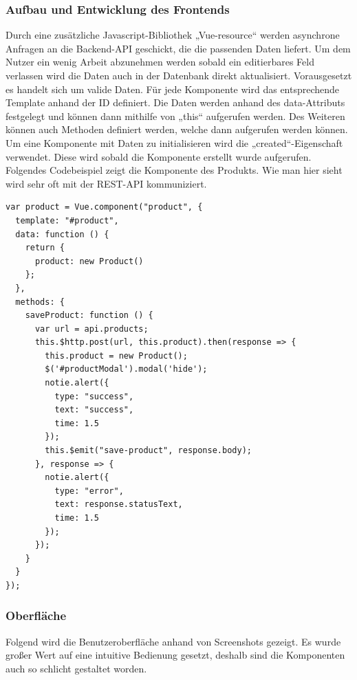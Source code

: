 \subsubsection{Aufbau und Entwicklung des Frontends}  
\label{sec:Aufbau und Entwicklung des Frontends-1}

Durch eine zusätzliche Javascript-Bibliothek „Vue-resource“ werden asynchrone Anfragen an die Backend-\ac{API} geschickt, die die passenden Daten liefert. Um dem Nutzer ein wenig Arbeit abzunehmen werden sobald ein editierbares Feld verlassen wird die Daten auch in der Datenbank direkt aktualisiert. Vorausgesetzt es handelt sich um valide Daten.
Für jede Komponente wird das entsprechende Template anhand der ID definiert.
Die Daten werden anhand des data-Attributs festgelegt und können dann mithilfe von „this“ aufgerufen werden. 
Des Weiteren können auch Methoden definiert werden, welche dann aufgerufen werden können. Um eine Komponente mit Daten zu initialisieren wird die „created“-Eigenschaft verwendet. Diese wird sobald die Komponente erstellt wurde aufgerufen. Folgendes Codebeispiel zeigt die Komponente des Produkts. Wie man hier sieht wird sehr oft mit der \ac{REST}-\ac{API} kommuniziert.

\begin{lstlisting}[frame=single]
var product = Vue.component("product", {
  template: "#product",
  data: function () {
    return {
      product: new Product()
    };
  },
  methods: {
    saveProduct: function () {
      var url = api.products;
      this.$http.post(url, this.product).then(response => {
        this.product = new Product();
        $('#productModal').modal('hide');
        notie.alert({
          type: "success",
          text: "success",
          time: 1.5
        });
        this.$emit("save-product", response.body);
      }, response => {
        notie.alert({
          type: "error",
          text: response.statusText,
          time: 1.5
        });
      });
    }
  }
});
\end{lstlisting}

\clearpage

\subsubsection{Oberfläche}  
\label{sec:Oberfläche-1}

Folgend wird die Benutzeroberfläche anhand von Screenshots gezeigt. Es wurde großer Wert auf eine intuitive Bedienung gesetzt, deshalb sind die Komponenten auch so schlicht gestaltet worden.

